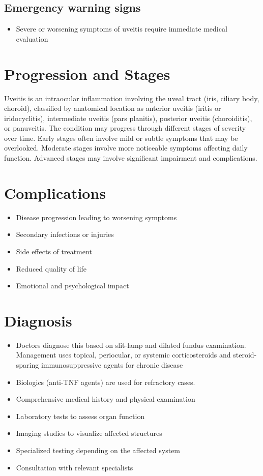 \subsection{Emergency warning signs}
\begin{itemize}[noitemsep]
  \item Severe or worsening symptoms of uveitis require immediate medical evaluation
\end{itemize}
\section{Progression and Stages}
Uveitis is an intraocular inflammation involving the uveal tract (iris, ciliary body, choroid), classified by anatomical location as anterior uveitis (iritis or iridocyclitis), intermediate uveitis (pars planitis), posterior uveitis (choroiditis), or panuveitis. The condition may progress through different stages of severity over time. Early stages often involve mild or subtle symptoms that may be overlooked. Moderate stages involve more noticeable symptoms affecting daily function. Advanced stages may involve significant impairment and complications.
\section{Complications}
\begin{itemize}[noitemsep]
  \item Disease progression leading to worsening symptoms
  \item Secondary infections or injuries
  \item Side effects of treatment
  \item Reduced quality of life
  \item Emotional and psychological impact
\end{itemize}
\section{Diagnosis}
\begin{itemize}[noitemsep]
  \item Doctors diagnose this based on slit-lamp and dilated fundus examination. Management uses topical, periocular, or systemic corticosteroids and steroid-sparing immunosuppressive agents for chronic disease
  \item Biologics (anti-TNF agents) are used for refractory cases.
  \item Comprehensive medical history and physical examination
  \item Laboratory tests to assess organ function
  \item Imaging studies to visualize affected structures
  \item Specialized testing depending on the affected system
  \item Consultation with relevant specialists
\end{itemize}
